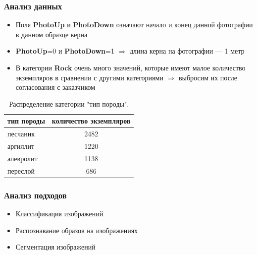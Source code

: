 \documentclass[xetex,mathserif,serif]{beamer}
\begin{document}
	
	\begin{frame}
		\frametitle{Анализ данных}

        \begin{itemize}
            \item Поля \textbf{PhotoUp} и \textbf{PhotoDown} означают начало и конец данной фотографии в данном образце керна
            \item \textbf{PhotoUp}=0 и \textbf{PhotoDown}=1 $\Rightarrow$ длина керна на фотографии — 1 метр
            \item В категории \textbf{Rock} очень много значений, которые имеют малое количество экземпляров в сравнении с другими категориями $\Rightarrow$ выбросим их после согласования с заказчиком
        \end{itemize} 
    
        \begin{table}[]
            \centering
            \begin{tabular}{|l|c|}
                \hline
                \textbf{тип породы} & \textbf{количество экземпляров} \\
                \hline
                песчаник            & 2482                            \\
                \hline
                аргиллит            & 1220                            \\
                \hline
                алевролит           & 1138                            \\
                \hline
                переслой            & 686                            \\
                \hline
            \end{tabular}
            \caption{Распределение категории "тип породы".}
            \label{table_rock}  
        \end{table}    
    
	\end{frame}	
	
	
	\begin{frame}
		\frametitle{Анализ подходов}
		
        \begin{itemize}
            \item Классификация изображений 
            \item Распознавание образов на изображениях
            \item Сегментация изображений
        \end{itemize} 
        
	\end{frame}	
	
\end{document}
